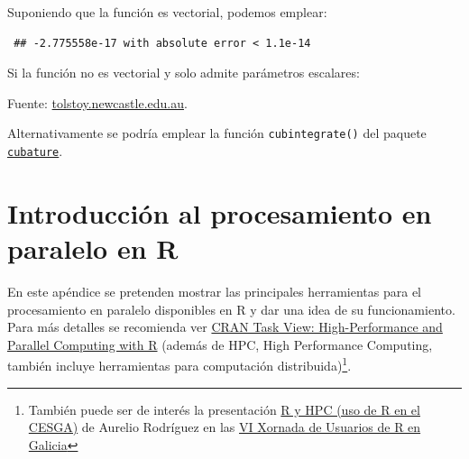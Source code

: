 \documentclass[
]{book}
\newenvironment{Shaded}{\begin{snugshade}}{\end{snugshade}}
\newcommand{\ControlFlowTok}[1]{\textcolor[rgb]{0.13,0.29,0.53}{\textbf{#1}}}
\newcommand{\FunctionTok}[1]{\textcolor[rgb]{0.00,0.00,0.00}{#1}}
\newcommand{\NormalTok}[1]{#1}
\newcommand{\SpecialCharTok}[1]{\textcolor[rgb]{0.00,0.00,0.00}{#1}}
\theoremstyle{break}
\theoremstyle{nonumberplain}
\begin{document}
Suponiendo que la función es vectorial, podemos emplear:

\begin{Shaded}
\end{Shaded}

\begin{verbatim}
 ## -2.775558e-17 with absolute error < 1.1e-14
\end{verbatim}

Si la función no es vectorial y solo admite parámetros escalares:

\begin{Shaded}
\end{Shaded}

Fuente: \href{http://tolstoy.newcastle.edu.au/R/help/04/10/5951.html}{tolstoy.newcastle.edu.au}.

Alternativamente se podría emplear la función \texttt{cubintegrate()} del paquete \href{https://bnaras.github.io/cubature/}{\texttt{cubature}}.

\hypertarget{intro-hpc}{%
\chapter{Introducción al procesamiento en paralelo en R}\label{intro-hpc}}

En este apéndice se pretenden mostrar las principales herramientas para el procesamiento en paralelo disponibles en R y dar una idea de su funcionamiento.
Para más detalles se recomienda ver \href{https://cran.r-project.org/view=HighPerformanceComputing}{CRAN Task View: High-Performance and Parallel Computing with R}
(además de HPC, High Performance Computing, también incluye herramientas para computación distribuida)\footnote{También puede ser de interés la presentación \href{https://www.r-users.gal/sites/default/files/10_aurelio_rodriguez.pdf}{R y HPC (uso de R en el CESGA)} de Aurelio Rodríguez en las \href{https://www.r-users.gal/pagina/programa-2018}{VI Xornada de Usuarios de R en Galicia}}.
\end{document}
